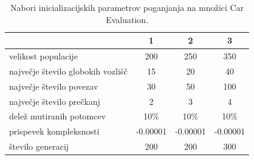 \begin{table}[H]
    \begin{center}
        \begin{tabular}{||l c c c||}
            \hline
            & 1        & 2        & 3 \\ [0.5ex]
            \hline
            velikost populacije               & 200      & 250      & 350      \\
            \hline
            največje število globokih vozlišč & 15       & 20       & 40       \\
            \hline
            največje število povezav          & 30       & 50       & 100      \\
            \hline
            največje število prečkanj         & 2        & 3        & 4        \\
            \hline
            delež mutiranih potomcev          & 10\%     & 10\%     & 10\%     \\
            \hline
            prispevek kompleksnosti           & -0.00001 & -0.00001 & -0.00001 \\
            \hline
            število generacij                 & 200      & 200      & 300      \\
            \hline
        \end{tabular}
    \end{center}
    \caption{Nabori inicializacijskih parametrov poganjanja na množici Car Evaluation.}
    \label{tab:param_car}
\end{table}

